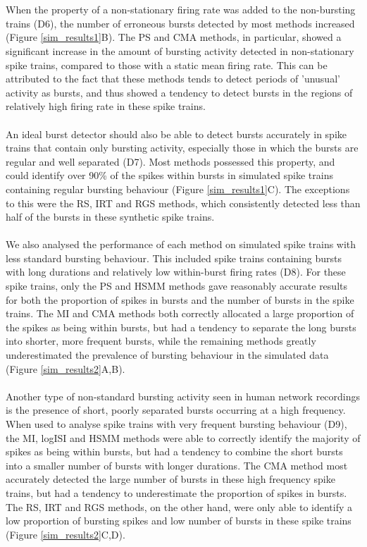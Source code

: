 \documentclass[12pt, titlepage]{article}
\begin{document}
	\\ \\ When the property of a non-stationary firing rate was added to the non-bursting trains (D6), the number of erroneous bursts detected by most methods increased (Figure \ref{sim_results1}B). The PS and CMA methods, in particular, showed a significant increase in the amount of bursting activity detected in non-stationary spike trains, compared to those with a static mean firing rate. This can be attributed to the fact that these methods tends to detect periods of 'unusual' activity as bursts, and thus showed a tendency to detect bursts in the regions of relatively high firing rate in these spike trains.
	\\ \\ An ideal burst detector should also be able to detect bursts accurately in spike trains that contain only bursting activity, especially those in which the bursts are regular and well separated (D7). Most methods possessed this property, and could identify over 90\% of the spikes within bursts in simulated spike trains containing regular bursting behaviour (Figure \ref{sim_results1}C). The exceptions to this were the RS, IRT and RGS methods, which consistently detected less than half of the bursts in these synthetic spike trains.
	\\ \\ We also analysed the performance of each method on simulated spike trains with less standard bursting behaviour. This included  spike trains containing bursts with long durations and relatively low within-burst firing rates (D8). For these spike trains, only the PS and HSMM methods gave reasonably accurate results for both the proportion of spikes in bursts and the number of bursts in the spike trains. The MI and CMA methods both correctly allocated a large proportion of the spikes as being within bursts, but had a tendency to separate the long bursts into shorter, more frequent bursts, while the remaining methods greatly underestimated the prevalence of bursting behaviour in the simulated data (Figure \ref{sim_results2}A,B).
	\\ \\ Another type of non-standard bursting activity seen in human network recordings is the presence of short, poorly separated bursts occurring at a high frequency. When used to analyse spike trains with very frequent bursting behaviour (D9), the MI, logISI and HSMM methods were able to correctly identify the majority of spikes as being within bursts, but had a tendency to combine the short bursts into a smaller number of bursts with longer durations. The CMA method most accurately detected the large number of bursts in these high frequency spike trains, but had a tendency to underestimate the proportion of spikes in bursts. The RS, IRT and RGS methods, on the other hand, were only able to identify a low proportion of bursting spikes and low number of bursts in these spike trains (Figure \ref{sim_results2}C,D).
\end{document}

